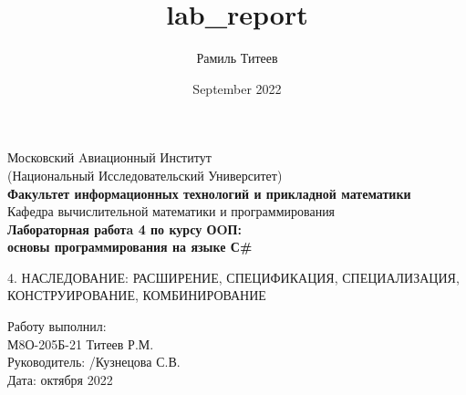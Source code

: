 \documentclass[12pt]{report}
\title{lab_report}
\author{Рамиль Титеев}
\date{September 2022}
\begin{document}
    \begin{titlepage}
        \begin{center}
            \large{Московский Aвиационный Институт}\\
            \large{(Национальный Исследовательский Университет)}\\
            \vspace{0.4in}
            \textbf{\LARGE{Факультет информационных технологий и прикладной математики}}\\
            \vspace{0.4in}
            \large{Кафедра вычислительной математики и программирования}\\
            \vspace{0.4in}
            \textbf{\LARGE{Лабораторная работa 4 по курсу ОOП:}}\\
            \textbf{\LARGE{основы программирования на языке С\#}}\\
        \end{center}
        \vspace{0.6in}
        \small{4. НАСЛЕДОВАНИЕ: РАСШИРЕНИЕ, СПЕЦИФИКАЦИЯ, СПЕЦИАЛИЗАЦИЯ, КОНСТРУИРОВАНИЕ, КОМБИНИРОВАНИЕ }\\
        \vfill
        \begin{flushleft}
                \large{ 
                    Работу выполнил:\\
                    М8О-205Б-21 \hspace{0.1in} 
                    Титеев Р.М. \hspace{0.3in}  
                    \hspace{0.3in} 
                    \\ 
                    Руководитель: /Кузнецова С.В. \\
                    Дата: \underline{\hspace{0.4in}} октября 2022\\
                }
        \end{flushleft}        
    \end{titlepage}
\end{document}

